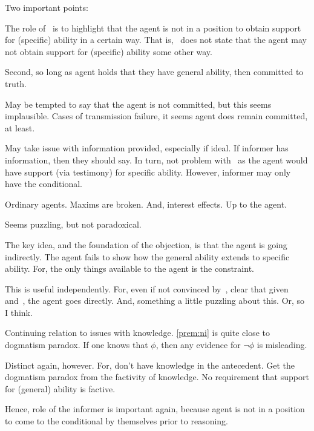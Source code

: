 \begin{note}
  Two important points:

  The role of~\nI{} is to highlight that the agent is not in a position to obtain support for (specific) ability in a certain way.
  That is,~\nI{} does not state that the agent may not obtain support for (specific) ability some other way.

  Second, so long as agent holds that they have general ability, then committed to truth.

  May be tempted to say that the agent is not committed, but this seems implausible.
  Cases of transmission failure, it seems agent does remain committed, at least.

  May take issue with information provided, especially if ideal.
  If informer has information, then they should say.
  In turn, not problem with~\nI{} as the agent would have support (via testimony) for specific ability.
  However, informer may only have the conditional.

  Ordinary agents.
  Maxims are broken.
  And, interest effects.
  Up to the agent.

  Seems puzzling, but not paradoxical.
\end{note}

\begin{note}
  The key idea, and the foundation of the objection, is that the agent is going indirectly.
  The agent fails to show how the general ability extends to specific ability.
  For, the only things available to the agent is the constraint.

  This is useful independently.
  For, even if not convinced by~\nI{}, clear that given \gsi{} and~\ESU{}, the agent goes directly.
  And, something a little puzzling about this.
  Or, so I think.
\end{note}

\begin{note}[Dogmatism]
  Continuing relation to issues with knowledge.
  \autoref{prem:ni} is quite close to dogmatism paradox.
  If one knows that \(\phi\), then any evidence for \(\lnot \phi\) is misleading.

  Distinct again, however.
  For, don't have knowledge in the antecedent.
  Get the dogmatism paradox from the factivity of knowledge.
  No requirement that support for (general) ability is factive.

  Hence, role of the informer is important again, because agent is not in a position to come to the conditional by themselves prior to reasoning.
\end{note}

